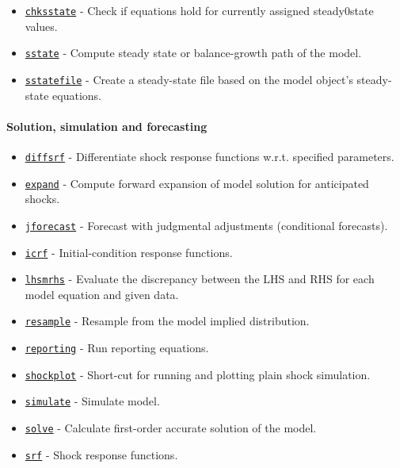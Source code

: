 \begin{itemize}
\itemsep1pt\parskip0pt
\item
  \href{model/chksstate}{\texttt{chksstate}} - Check if equations hold
  for currently assigned steady0state values.
\item
  \href{model/sstate}{\texttt{sstate}} - Compute steady state or
  balance-growth path of the model.
\item
  \href{model/sstatefile}{\texttt{sstatefile}} - Create a steady-state
  file based on the model object's steady-state equations.
\end{itemize}

\paragraph{Solution, simulation and
forecasting}

\begin{itemize}
\itemsep1pt\parskip0pt
\item
  \href{model/diffsrf}{\texttt{diffsrf}} - Differentiate shock response
  functions w.r.t. specified parameters.
\item
  \href{model/expand}{\texttt{expand}} - Compute forward expansion of
  model solution for anticipated shocks.
\item
  \href{model/jforecast}{\texttt{jforecast}} - Forecast with judgmental
  adjustments (conditional forecasts).
\item
  \href{model/icrf}{\texttt{icrf}} - Initial-condition response
  functions.
\item
  \href{model/lhsmrhs}{\texttt{lhsmrhs}} - Evaluate the discrepancy
  between the LHS and RHS for each model equation and given data.
\item
  \href{model/resample}{\texttt{resample}} - Resample from the model
  implied distribution.
\item
  \href{model/reporting}{\texttt{reporting}} - Run reporting equations.
\item
  \href{model/shockplot}{\texttt{shockplot}} - Short-cut for running and
  plotting plain shock simulation.
\item
  \href{model/simulate}{\texttt{simulate}} - Simulate model.
\item
  \href{model/solve}{\texttt{solve}} - Calculate first-order accurate
  solution of the model.
\item
  \href{model/srf}{\texttt{srf}} - Shock response functions.
\end{itemize}

